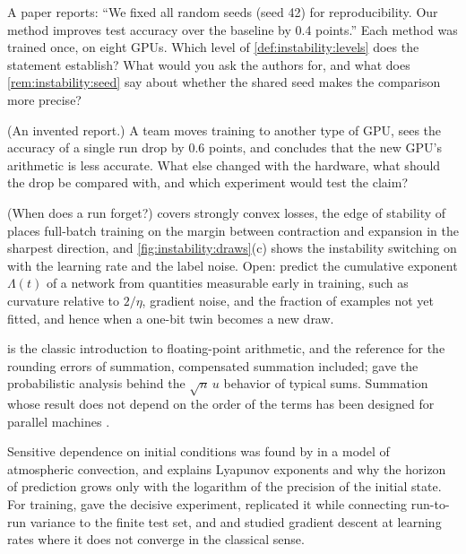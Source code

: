 \begin{refsection}
\begin{exercises}
\item \critique A paper reports: ``We fixed all random seeds (seed 42) for reproducibility. Our method improves test accuracy over the baseline by 0.4 points.'' Each method was trained once, on eight GPUs. Which level of \cref{def:instability:levels} does the statement establish? What would you ask the authors for, and what does \cref{rem:instability:seed} say about whether the shared seed makes the comparison more precise?

\item \critique (An invented report.) A team moves training to another type of GPU, sees the accuracy of a single run drop by 0.6 points, and concludes that the new GPU's arithmetic is less accurate. What else changed with the hardware, what should the drop be compared with, and which experiment would test the claim?

\item \research (When does a run forget?)  covers strongly convex losses, the edge of stability of \textcite{CohenEtAl2021} places full-batch training on the margin between contraction and expansion in the sharpest direction, and \cref{fig:instability:draws}(c) shows the instability switching on with the learning rate and the label noise. Open: predict the cumulative exponent $\Lambda(t)$ of a network from quantities measurable early in training, such as curvature relative to $2/\eta$, gradient noise, and the fraction of examples not yet fitted, and hence when a one-bit twin becomes a new draw.
\end{exercises}

\notesandrefs
\Textcite{Goldberg1991} is the classic introduction to floating-point arithmetic, and \textcite[Chapter~4]{Higham2002} the reference for the rounding errors of summation, compensated summation included; \textcite{HighamMary2019} gave the probabilistic analysis behind the $\sqrt n\,u$ behavior of typical sums. Summation whose result does not depend on the order of the terms has been designed for parallel machines \parencite{DemmelNguyen2015}.

Sensitive dependence on initial conditions was found by \textcite{Lorenz1963} in a model of atmospheric convection, and \textcite[Sections~9.3 and 10.5]{Strogatz2015} explains Lyapunov exponents and why the horizon of prediction grows only with the logarithm of the precision of the initial state. For training, \textcite{SummersDinneen2021} gave the decisive experiment, \textcite{Jordan2024} replicated it while connecting run-to-run variance to the finite test set, and \textcite{KongTao2020} and \textcite{CohenEtAl2021} studied gradient descent at learning rates where it does not converge in the classical sense.


\end{refsection}
